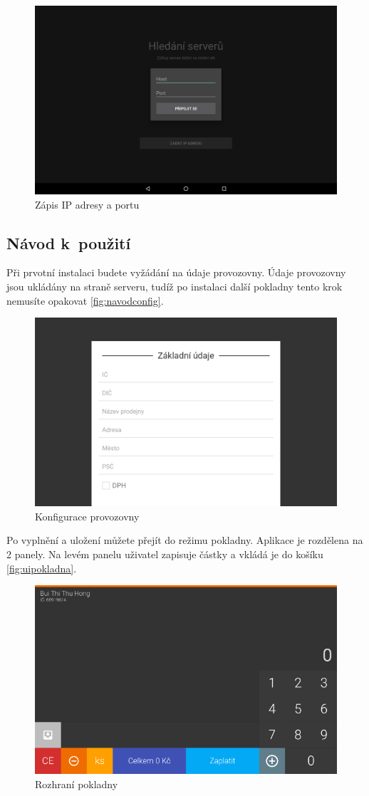 \documentclass[a4paper,11pt,oneside]{article}
\begin{document}
\begin{figure}[H]
	\centering
	\includegraphics[width=0.6\linewidth]{../navod_detect}
	\caption{Zápis IP adresy a portu}
	\label{fig:navoddetect}
\end{figure}

\subsection{Návod k~použití}

Při prvotní instalaci budete vyžádání na údaje provozovny. Údaje provozovny jsou ukládány na straně serveru, tudíž po instalaci další pokladny tento krok nemusíte opakovat \eqref{fig:navodconfig}.

\begin{figure}[H]
	\centering
	\includegraphics[width=0.7\linewidth]{../navod_config}
	\caption{Konfigurace provozovny}
	\label{fig:navodconfig}
\end{figure}


Po vyplnění a uložení můžete přejít do režimu pokladny. Aplikace je rozdělena na 2 panely. Na levém panelu uživatel zapisuje částky a vkládá je do košíku \eqref{fig:uipokladna}. 

\begin{figure}[H]
	\centering
	\includegraphics[width=0.7\linewidth]{../ui_pokladna}
	\caption{Rozhraní pokladny}
	\label{fig:uipokladna}
\end{figure}
\end{document}

